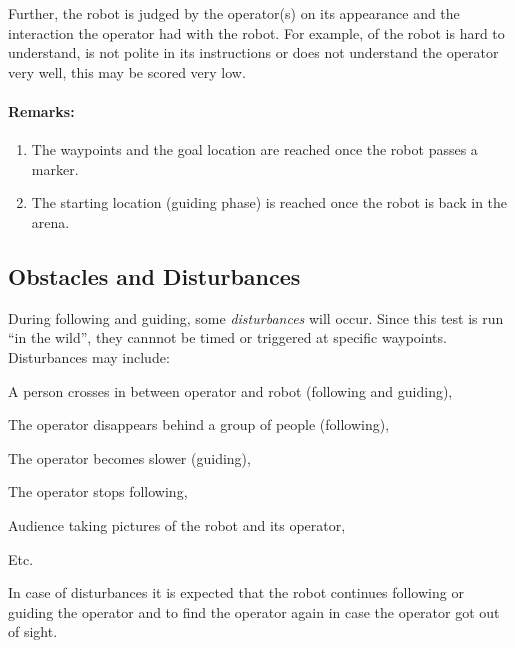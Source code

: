 Further, the robot is judged by the operator(s) on its appearance and the interaction the operator had with the robot. 
For example, of the robot is hard to understand, is not polite in its instructions or does not understand the operator very well, this may be scored very low.

\paragraph*{Remarks:}
\begin{enumerate}
\item The waypoints and the goal location are reached once the robot passes a marker.
\item The starting location (guiding phase) is reached once the robot is back in the arena.
\end{enumerate}

\subsection{Obstacles and Disturbances}
During following and guiding, some \emph{disturbances} will occur. 
Since this test is run ``in the wild'', they cannnot be timed or triggered at specific waypoints. 
Disturbances may include:
\begin{compactitem}
\item A person crosses in between operator and robot (following and guiding), 
\item The operator disappears behind a group of people (following),
\item The operator becomes slower (guiding),
\item The operator stops following,
\item Audience taking pictures of the robot and its operator,
\item Etc.
\end{compactitem}
In case of disturbances it is expected that the robot continues following or guiding the operator and to find the operator again in case the operator got out of sight.


